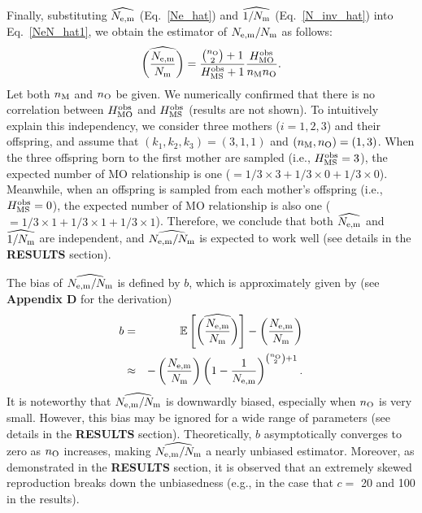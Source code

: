 \documentclass[12pt, English]{article}
\begin{document}
\begin{spacing}{1.9}
Finally, substituting $\widehat{N_{\rm e,m}}$ (Eq.~\ref{Ne_hat}) and $\widehat{1/N_{\rm m}}$ (Eq.~\ref{N_inv_hat}) into Eq.~\ref{NeN_hat1}, we obtain the estimator of $N_{\rm e,m}/N_{\rm m}$ as follows:
\begin{equation}
\widehat{\left(\frac{N_{\rm e,m}}{N_{\rm m}}\right) } = \frac{\binom{n_{\rm O}}{2}+1}{H_{\rm MS}^{\rm obs}+1} \frac{H_{\rm MO}^{\rm obs} } {n_{\rm M}n_{\rm O}}.
\label{NeN_hat2}
\end{equation}
Let both $n_{\rm M}$ and $n_{\rm O}$ be given. We numerically confirmed that there is no correlation between $H_{\rm MO}^{\rm obs}$ and $H_{\rm MS}^{\rm obs}$ (results are not shown). To intuitively explain this independency, we consider three mothers ($i=1, 2, 3$) and their offspring, and assume that $(k_1, k_2, k_3)=(3, 1, 1)$ and $(n_{\rm M}, n_{\rm O})=(1,3)$. When the three offspring born to the first mother are sampled (i.e., $H_{\rm MS}^{\rm obs}=3$), the expected number of MO relationship is one ($=1/3\times3 + 1/3\times0 + 1/3\times0$). Meanwhile, when an offspring is sampled from each mother's offspring (i.e., $H_{\rm MS}^{\rm obs}=0$), the expected number of MO relationship is also one ($=1/3\times1 + 1/3\times1 + 1/3\times1$). Therefore, we conclude that both $\widehat{N_{\rm e,m}}$ and $\widehat{1/N_{\rm m}}$ are independent, and $\widehat{N_{\rm e,m}/N_{\rm m}}$ is expected to work well (see details in the {\bf RESULTS} section).  

The bias of $\widehat{N_{\rm e,m}/N_{\rm m} }$ is defined by $b$, which is approximately given by (see {\bf Appendix D} for the derivation)
\begin{eqnarray}
b &=& \mathbb{E}\left[ \widehat{\left(\frac{N_{\rm e,m}}{N_{\rm m}}\right) } \right] - \left(\frac{N_{\rm e,m}}{N_{\rm m}}\right)\nonumber\\
&\approx& -\left(\frac{N_{\rm e,m}}{N_{\rm m}}\right) \left(1-\frac{1}{N_{\rm e,m}}\right)^{\binom{n_{\rm O}}{2}+1}.
\label{bias}
\end{eqnarray}
It is noteworthy that $\widehat{N_{\rm e,m}/N_{\rm m}}$ is downwardly biased, especially when $n_{\rm O}$ is very small. However, this bias may be ignored for a wide range of parameters (see details in the {\bf RESULTS} section). Theoretically, $b$ asymptotically converges to zero as $n_{\rm O}$ increases, making $\widehat{N_{\rm e,m}/N_{\rm m}}$ a nearly unbiased estimator. Moreover, as demonstrated in the {\bf RESULTS} section, it is observed that an extremely skewed reproduction breaks down the unbiasedness (e.g., in the case that $c=$ 20 and 100 in the results). 


\end{spacing}
\end{document}
